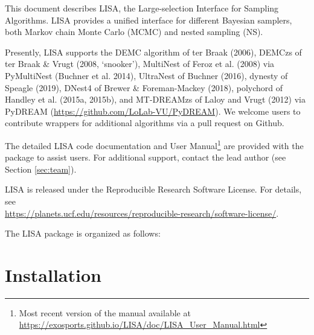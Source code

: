 \documentclass[letterpaper, 12pt]{article}
\begin{document}
\noindent This document describes LISA, the Large-selection Interface for 
Sampling Algorithms.  LISA provides a unified interface for different 
Bayesian samplers, both Markov chain Monte Carlo (MCMC) and nested sampling 
(NS).  \newline

\noindent Presently, LISA supports the 
DEMC algorithm of ter Braak (2006), 
DEMCzs of ter Braak \& Vrugt (2008, `snooker'), 
MultiNest of Feroz et al. (2008) via PyMultiNest (Buchner et al. 2014), 
UltraNest of Buchner (2016), 
dynesty of Speagle (2019), 
DNest4 of Brewer \& Foreman-Mackey (2018),  
polychord of Handley et al. (2015a, 2015b), and
MT-DREAMzs of Laloy and Vrugt (2012) via PyDREAM (\href{https://github.com/LoLab-VU/PyDREAM}{https://github.com/LoLab-VU/PyDREAM}).  
We welcome users to contribute wrappers for additional 
algorithms via a pull request on Github. \newline

\noindent The detailed LISA code documentation and User Manual\footnote{Most recent version of the manual available at 
\href{https://exosports.github.io/LISA/doc/LISA_User_Manual.html}{https://exosports.github.io/LISA/doc/LISA\_User\_Manual.html}} 
are provided with the package to assist users. 
For additional support, contact the lead author (see Section \ref{sec:team}). \newline

\noindent LISA is released under the Reproducible Research Software License.  
For details, see \\
\href{https://planets.ucf.edu/resources/reproducible-research/software-license/}{https://planets.ucf.edu/resources/reproducible-research/software-license/}.\newline

\noindent The LISA package is organized as follows: \newline
\noindent{}
\vspace{0.7cm}

\section{Installation}
\label{sec:installation}
\end{document}
